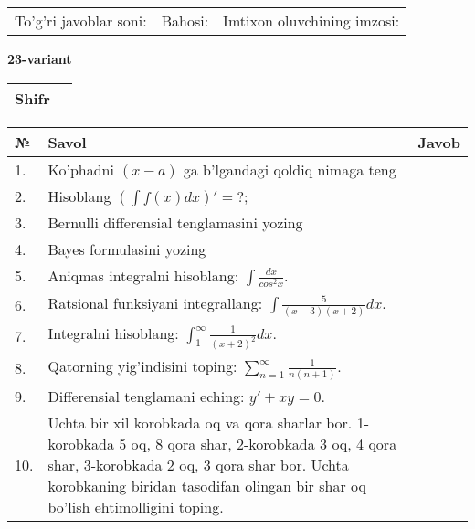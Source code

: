 \documentclass{article}
\begin{document}
  \vspace{1cm}
  
  \begin{tabular}{lll}
  To'g'ri javoblar soni: \underline{\hspace{1.5cm}} & 
  Bahosi: \underline{\hspace{1.5cm}} & 
  Imtixon oluvchining imzosi: \underline{\hspace{2cm}} \\
  \end{tabular}
  
  \egroup
  
  \newpage
  
  
  \textbf{23-variant}\\
  
  \bgroup
  \def\arraystretch{1.6} %
  
  \begin{tabular}{|m{5.7cm}|m{9.5cm}|}
  \hline
  Shifr & \\
  \hline
  \end{tabular}
  
  \vspace{1cm}
  
  \begin{tabular}{|m{0.7cm}|m{10cm}|m{4cm}|}
  \hline
  № & Savol & Javob \\
  \hline
  1. & Ko'phadni \((x - a)\) ga b'lgandagi qoldiq nimaga teng &  \\
  \hline
  2. & Hisoblang \(\left( \int {f(x)dx} \right)' = ?\); &  \\
  \hline
  3. & Bernulli differensial tenglamasini yozing &  \\
  \hline
  4. & Bayes formulasini yozing &  \\
  \hline
  5. & Aniqmas integralni hisoblang: \(\int \frac{dx}{cos^{2}x}\). &  \\
  \hline
  6. & Ratsional funksiyani integrallang: \(\int {\frac{5}{(x - 3)(x + 2)}dx}\). &  \\
  \hline
  7. & Integralni hisoblang: \(\int_{1}^{\infty}{\frac{1}{(x + 2)^{2}}dx}\). &  \\
  \hline
  8. & Qatorning yig'indisini toping: \(\sum_{n = 1}^{\infty}\frac{1}{n(n + 1)}\). &  \\
  \hline
  9. & Differensial tenglamani eching: \(y' + xy = 0\). &  \\
  \hline
  10. & Uchta bir xil korobkada oq va qora sharlar bor. 1-korobkada 5 oq, 8 qora shar, 2-korobkada 3 oq, 4 qora shar, 3-korobkada 2 oq, 3 qora shar bor. Uchta korobkaning biridan tasodifan olingan bir shar oq bo'lish ehtimolligini toping. &  \\
  \hline
  \end{tabular}
  
\end{document}

